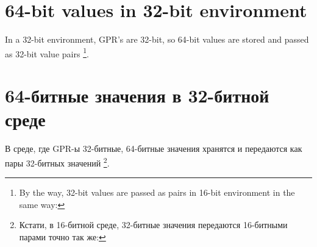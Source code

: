 \ifdefined\ENGLISH
\chapter{64-bit values in 32-bit environment}
\label{sec:64bit_in_32_env}

In a 32-bit environment, \ac{GPR}'s are 32-bit, so 64-bit values are stored and passed as 32-bit value pairs
\footnote{By the way, 32-bit values are passed as pairs in 16-bit environment in the same way: }.
\fi

\ifdefined\RUSSIAN
\chapter{64-битные значения в 32-битной среде}
\label{sec:64bit_in_32_env}

В среде, где \ac{GPR}-ы 32-битные, 64-битные значения хранятся и передаются как пары 32-битных значений
\footnote{Кстати, в 16-битной среде, 32-битные значения передаются 16-битными парами точно так же: }.
\fi







